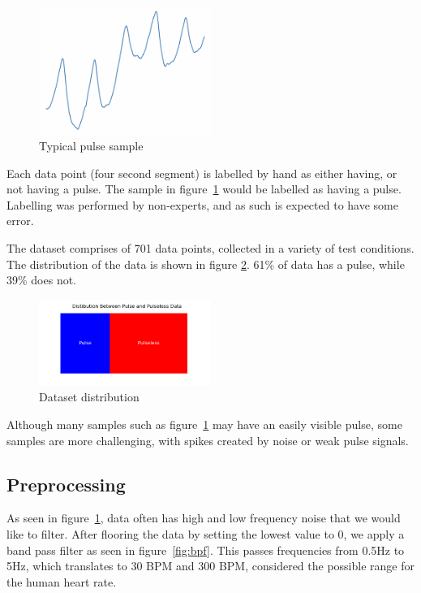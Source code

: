 \documentclass{article}
\begin{document}
\begin{figure}[H]
    \centering
    \includegraphics[width=0.5\textwidth]{../media/raw_pulse.png}
    \caption{Typical pulse sample}
    \label{fig:data_example}
\end{figure}

Each data point (four second segment) is labelled by hand as either having, or not having a pulse. The sample in figure~\ref{fig:data_example} would be labelled as having a pulse. Labelling was performed by non-experts, and as such is expected to have some error.

The dataset comprises of 701 data points, collected in a variety of test conditions. The distribution of the data is shown in figure \ref{fig:pulse_distro}. 61\% of data has a pulse, while 39\% does not.

\begin{figure}[H]
    \centering
    \includegraphics[width=0.5\textwidth]{../media/pulse_bar.png}
    \caption{Dataset distribution}
    \label{fig:pulse_distro}
\end{figure}

Although many samples such as figure~\ref{fig:data_example} may have an easily visible pulse, some samples are more challenging, with spikes created by noise or weak pulse signals. 


\subsection{Preprocessing}

As seen in figure~\ref{fig:data_example}, data often has high and low frequency noise that we would like to filter. After flooring the data by setting the lowest value to 0, we apply a band pass filter as seen in figure~\ref{fig:bpf}. This passes frequencies from 0.5Hz to 5Hz, which translates to 30 BPM and 300 BPM, considered the possible range for the human heart rate.
\end{document}
